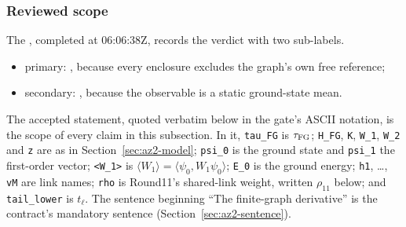 \subsubsection{Reviewed scope}
\label{sec:az2-scope}
The , completed at
06:06:38Z, records the verdict  with two
sub-labels.
\begin{itemize}\raggedright
\item primary: , because every enclosure
 excludes the graph's own free reference;
\item secondary: , because the observable is a
 static ground-state mean.
\end{itemize}
The accepted statement, quoted verbatim below in the gate's ASCII notation, is
the scope of every claim in this subsection. In it, \texttt{tau\_FG} is
$\tau_{\mathrm{FG}}$; \texttt{H\_FG}, \texttt{K}, \texttt{W\_1}, \texttt{W\_2} and
\texttt{z} are as in Section~\ref{sec:az2-model}; \texttt{psi\_0} is the
ground state and \texttt{psi\_1} the first-order vector;
\texttt{<W\_1>} is $\langle W_1\rangle=\langle\psi_0,W_1\psi_0\rangle$;
\texttt{E\_0} is the ground energy; \texttt{h1}, \dots, \texttt{vM} are link
names; \texttt{rho} is Round11's shared-link weight, written $\rho_{11}$ below;
and \texttt{tail\_lower} is $t_\ell$. The sentence beginning ``The
finite-graph derivative'' is the contract's mandatory sentence
(Section~\ref{sec:az2-sentence}).

